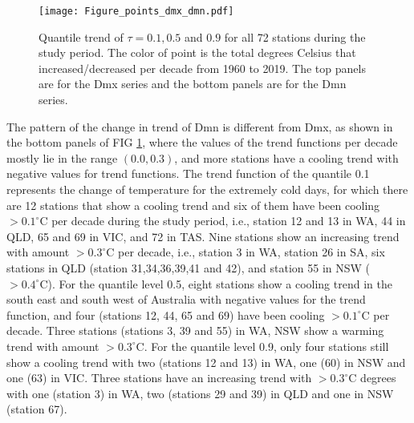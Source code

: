 \documentclass[fleqn,10pt]{wlscirep}
\newcommand{\dc}[1]{#1^{ \circ}\mathrm{C}}
\begin{document}
\begin{figure}[H]
	\hspace{-1cm}	\texttt{[image: Figure\_points\_dmx\_dmn.pdf]}
	\caption{Quantile trend of $\tau = 0.1,0.5$ and $0.9$ for all 72 stations during the study period. The color of point is the total degrees Celsius that increased/decreased per decade from 1960 to 2019. The top panels are for the Dmx series and the bottom panels are for the Dmn series. }
	\label{fig.mapdots}
\end{figure}


The pattern of the change in trend of Dmn is different from Dmx, as shown in the bottom panels of FIG \ref{fig.mapdots}, where  the values of the trend functions per decade mostly lie in the range $(0.0, 0.3)$, and more stations have a cooling trend with negative values for trend functions.
The trend function of the quantile 0.1 represents the change of temperature for the extremely cold days,  for which there are 12 stations that show a cooling trend and six of them have been cooling $>\dc{0.1}$ per decade during the study period, i.e., station 12 and 13 in WA, 44 in QLD, 65 and 69 in VIC, and 72 in TAS.
Nine stations show an increasing trend with amount $>\dc{0.3}$ per decade, i.e., station 3 in WA, station 26 in SA,  six stations in QLD (station 31,34,36,39,41 and 42), and station 55 in NSW ($>\dc{0.4}$).
For the quantile level 0.5, eight stations show a cooling trend in the south east and south west of Australia with negative values for the trend function, and four (stations 12, 44, 65 and 69) have been cooling $>\dc{0.1}$ per decade.
Three stations (stations 3, 39 and 55) in WA, NSW show a warming trend with amount $>\dc{0.3}$. For the quantile level 0.9, only four stations still show a cooling trend with two (stations 12 and 13) in WA, one (60) in NSW and one (63) in VIC. Three stations have an increasing trend with $>\dc{0.3}$ degrees with one (station 3) in WA, two (stations 29 and 39) in QLD and one in NSW (station 67).
\end{document}

